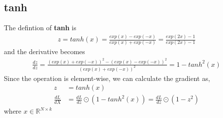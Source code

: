 \documentclass[../../deep_learning_notes.tex]{subfiles}
\begin{document}
\subsection{tanh}
The defintion of \textbf{tanh} is 
\begin{align*}
    z = tanh(x) = \frac{exp(x) - exp(-x)}{exp(x) + exp(-x)} = \frac{exp(2x) - 1}{exp(2x) - 1}
\end{align*}
and the derivative becomes
\begin{align*}
    \frac{dz}{dz} = \frac{(exp(x) + exp(-x))^{2} - (exp(x) - exp(-x))^{2}}{(exp(x) + exp(-x))^{2}} = 1 - tanh^{2}(x)
\end{align*}
Since the operation is element-wise, we can calculate the gradient as,
\begin{align*}
    z &= tanh(x)\\
    \frac{dL}{dX} &= \frac{dL}{dz} \odot (1 - tanh^{2}(x)) = \frac{dL}{dz} \odot (1 - z^{2})
\end{align*}
where $x \in \mathbb{R}^{N \times k}$
\end{document}
